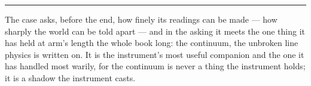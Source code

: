 %
%
%
%

\bigskip
\begin{center}
\rule{0.4\textwidth}{0.4pt}
\end{center}
\bigskip

\noindent The case asks, before the end, how finely its readings can be made --- how sharply the world can be told
apart --- and in the asking it meets the one thing it has held at arm's length the whole book long: the
continuum, the unbroken line physics is written on. It is the instrument's most useful companion and the one it
has handled most warily, for the continuum is never a thing the instrument holds; it is a shadow the instrument
casts.

